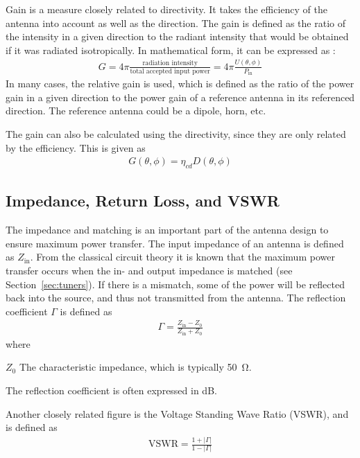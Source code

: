 Gain is a measure closely related to directivity. It takes the efficiency of the antenna into account as well as the direction. The gain is defined as the ratio of the intensity in a given direction to the radiant intensity that would be obtained if it was radiated isotropically. In mathematical form, it can be expressed as \cite{balanis2012antenna}:
\begin{align} %
  G = 4 \pi \frac{\text{radiation intensity}}{\text{total accepted input power}} = 4 \pi \frac{U(\theta,\phi)}{P_{\text{in}}}
\end{align}
In many cases, the relative gain is used, which is defined as the ratio of the power gain in a given direction to the power gain of a reference antenna in its referenced direction. The reference antenna could be a dipole, horn, etc. 

The gain can also be calculated using the directivity, since they are only related by the efficiency. This is given as \cite{balanis2012antenna}
\begin{align} %
  G(\theta,\phi) = \eta_{cd}D(\theta, \phi)
\end{align}

\subsection{Impedance, Return Loss, and VSWR}
The impedance and matching is an important part of the antenna design to ensure maximum power transfer. The input impedance of an antenna is defined as $Z_{\text{in}}$. From the classical circuit theory it is known that the maximum power transfer occurs when the in- and output impedance is matched (see Section~\ref{sec:tuners}). If there is a mismatch, some of the power will be reflected back into the source, and thus not transmitted from the antenna. The reflection coefficient $\Gamma$ is defined as \cite{pozar2011microwave}
\begin{align}%
    \Gamma = \frac{Z_{\text{in}}-Z_0}{Z_{\text{in}}+Z_0}
\end{align}
where
\begin{where}
\item[$Z_0$] The characteristic impedance, which is typically \SI{50}{\ohm}.
\end{where}
The reflection coefficient is often expressed in \si{dB}. 

Another closely related figure is the Voltage Standing Wave Ratio (VSWR), and is defined as \cite{pozar2011microwave}
\begin{align}%
  \text{VSWR} = \frac{1+|\Gamma|}{1-|\Gamma|} 
\end{align}

